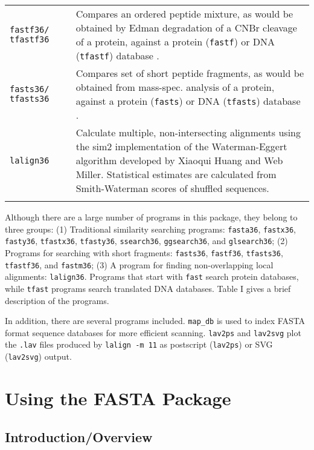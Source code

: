 \documentclass[11pt]{article}
\begin{document}
\begin{table}
\begin{tabular}{ p{0.8in} p{0.6in} p{4.6 in}}
\texttt{fastf36/ tfastf36}&  &
Compares an ordered peptide mixture, as would be obtained by
Edman degradation of a CNBr cleavage of a protein, against a protein
(\texttt{fastf}) or DNA (\texttt{tfastf}) database \cite{wrp021}.\\[1 ex]

\texttt{fasts36/ tfasts36}&  &
Compares set of short peptide fragments, as would be obtained
from mass-spec. analysis of a protein, against a
protein (\texttt{fasts}) or DNA (\texttt{tfasts}) database \cite{wrp021}.\\[1 ex]

\texttt{lalign36} & & Calculate multiple, non-intersecting alignments
using the sim2 implementation of the Waterman-Eggert
algorithm\cite{wat875} developed by Xiaoqui Huang and Web
Miller\cite{mil908}.  Statistical estimates are calculated from
Smith-Waterman scores of shuffled sequences. \\[1 ex]

\hline \\
\end{tabular}
\end{table}

Although there are a large number of programs in this package, they
belong to three groups: (1) Traditional similarity searching programs:
\texttt{fasta36}, \texttt{fastx36}, \texttt{fasty36},
\texttt{tfastx36}, \texttt{tfasty36}, \texttt{ssearch36},
\texttt{ggsearch36}, and \texttt{glsearch36}; (2) Programs for
searching with short fragments: \texttt{fasts36}, \texttt{fastf36},
\texttt{tfasts36}, \texttt{tfastf36}, and \texttt{fastm36}; (3) A
program for finding non-overlapping local alignments: \texttt{lalign36}.
Programs that start with \texttt{fast} search protein databases, while
\texttt{tfast} programs search translated DNA databases.  Table I
gives a brief description of the programs.

In addition, there are several programs included. \texttt{map\_db} is
used to index FASTA format sequence databases for more efficient
scanning. \texttt{lav2ps} and \texttt{lav2svg} plot the \texttt{.lav}
files produced by \texttt{lalign -m 11} as postscript
(\texttt{lav2ps}) or SVG (\texttt{lav2svg}) output.

\section{Using the FASTA Package}
\subsection{Introduction/Overview}
\end{document}
